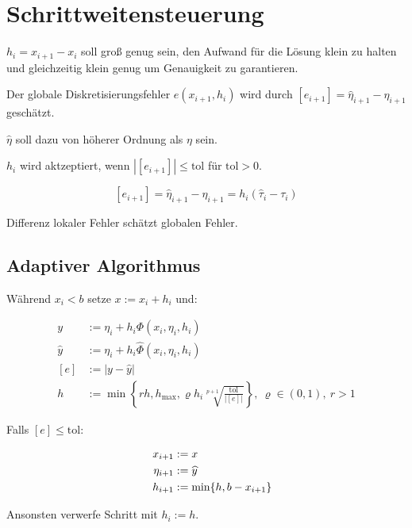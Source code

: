 \section*{Schrittweitensteuerung}

$h_i = x_{i+1} - x_i$ soll groß genug sein, den Aufwand für die Lösung klein zu halten und gleichzeitig klein genug um Genauigkeit zu garantieren.

\spacing

Der globale Diskretisierungsfehler $e(x_{i+1},h_i)$ wird durch $[e_{i+1}] = \widehat{\eta}_{i+1} - \eta_{i+1}$ geschätzt.

$\widehat{\eta}$ soll dazu von höherer Ordnung als $\eta$ sein.

$h_i$ wird aktzeptiert, wenn $|[e_{i+1}]| \leq \text{tol}$ für $\text{tol} > 0$.

\vspace{-2mm}
$$[e_{i+1}] = \widehat{\eta}_{i+1} - \eta_{i+1} = h_i(\widehat{\tau}_i - \tau_i)$$

Differenz lokaler Fehler schätzt globalen Fehler.

\subsection*{Adaptiver Algorithmus}

Während $x_i < b$ setze $x := x_i + h_i$ und:

\vspace{-4mm}
\begin{align*}
y &:= \eta_i + h_i \Phi(x_i,\eta_i,h_i) \\
\widehat{y} &:= \eta_i + h_i \widehat{\Phi}(x_i,\eta_i,h_i) \\
[e] &:= |y-\widehat{y}| \\
h &:= \min\left\{rh, h_\text{max}, \varrho h_i \sqrt[p+1]{\frac{\text{tol}}{|[e]|}}\right\}, \ \varrho \in (0,1), \ r > 1
\end{align*}

Falls $[e] \leq \text{tol}$:

\vspace*{-10.7mm}
\begin{align*}
\hspace*{4mm}
x_{i+1} &:= x \\
\eta_{i+1} &:= \widehat{y} \\
h_{i+1} &:= \min\{h, b-x_{i+1}\}
\end{align*}

Ansonsten verwerfe Schritt mit $h_i := h$.

